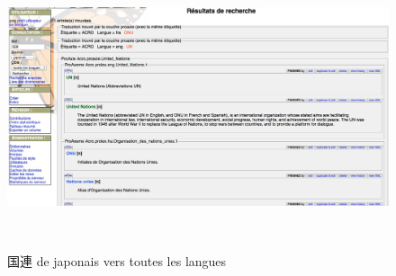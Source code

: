 \documentclass[10pt,a4paper,twoside]{article}
\begin{document}
\begin{itemize}
\begin{figure}[htbp] 
\begin{center} 
\includegraphics[width=14cm]{images/scenario2.jpg}
\end{center} 
\caption{国連 de japonais vers toutes les langues} \label{image} \
\end{figure}



\end{itemize}
\end{document}
